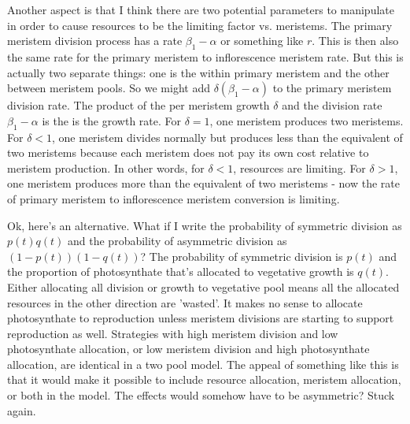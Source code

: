 \documentclass[12pt, oneside]{article}   	%
\begin{document}
Another aspect is that I think there are two potential parameters to manipulate in order to cause resources to be the limiting factor vs. meristems. The primary meristem division process has a rate $\beta_1 - \alpha$ or something like $r$. This is then also the same rate for the primary meristem to inflorescence meristem rate. But this is actually two separate things: one is the within primary meristem and the other between meristem pools. So we might add $ \delta (\beta_1-\alpha)$ to the primary meristem division rate. The product of the per meristem growth $\delta$ and the division rate $\beta_1 - \alpha$ is the is the growth rate. For $\delta = 1$, one meristem produces two meristems. For $\delta < 1$, one meristem divides normally but produces less than the equivalent of two meristems because each meristem does not pay its own cost relative to meristem production. In other words, for $\delta <1$, resources are limiting. For $\delta>1$, one meristem produces more than the equivalent of two meristems - now the rate of primary meristem to inflorescence meristem conversion is limiting.

Ok, here's an alternative. What if I write the probability of symmetric division as $p(t) q(t)$ and the probability of asymmetric division as $(1-p(t)) (1-q(t))$? The probability of symmetric division is $p(t)$ and the proportion of photosynthate that's allocated to vegetative growth is $q(t)$. Either allocating all division or growth to vegetative pool means all the allocated resources in the other direction are 'wasted'. It makes no sense to allocate photosynthate to reproduction unless meristem divisions are starting to support reproduction as well.  Strategies with high meristem division and low photosynthate allocation, or low meristem division and high photosynthate allocation, are identical in a two pool model. The appeal of something like this is that it would make it possible to include resource allocation, meristem allocation, or both in the model. The effects would somehow have to be asymmetric? Stuck again.

\end{document}
